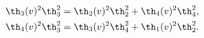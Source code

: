 \begin{equation}\label{abstruse-general}
  \begin{split}
    \th_3(v)^2 \th_3^2 = \th_2(v)^2 \th_2^2 +\th_4(v)^2 \th_4^2,\\
    \th_4(v)^2 \th_3^2 = \th_3(v)^2 \th_4^2 +\th_1(v)^2 \th_2^2.
  \end{split}
\end{equation}

